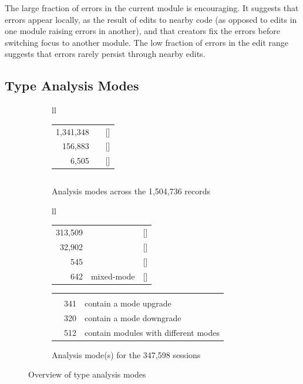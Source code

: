 \documentclass[english,submission,cleveref]{programming}
\begin{document}
The large fraction of errors in the current module is encouraging.
It suggests that errors appear locally, as the result of edits to nearby
code (as opposed to edits in one module raising errors in another), and
that creators fix the errors before switching focus to another
module.
The low fraction of errors in the edit range suggests that errors rarely
persist through nearby edits.


\subsection{Type Analysis Modes}
\label{s:type-analysis-modes}

\begin{figure}[t]\centering
  \begin{subfigure}[t]{\columnwidth}
    \begin{tabular}[t]{ll}
      \begin{tabular}[t]{r@{~~}l@{~}r}
         1,341,348 & \mnocheck{}          & [\pct{89.14}] \\
           156,883 & \mnonstrict{}        & [\pct{10.43}] \\
             6,505 & \mstrict{}           & [\pct{ 0.43}]
      \end{tabular}
      \begin{tabular}[t]{r@{~~}l@{~~}r}
      \end{tabular}
    \end{tabular}
    \caption{Analysis modes across the 1,504,736 records}
    \label{f:total-records}
  \end{subfigure}

  \begin{subfigure}[t]{\columnwidth}
    \begin{tabular}[t]{ll} \\
      \begin{tabular}[t]{r@{~~}r@{~}r}
        313,509 & \mnocheck{}   & [\pct{90.19}] \\
         32,902 & \mnonstrict{} & [\pct{ 9.47}] \\
            545 & \mstrict{}    & [\pct{ 0.16}] \\
            642 & mixed-mode    & [\pct{ 0.18}]
      \end{tabular}
      \begin{tabular}[t]{l@{~~}ll}
        \zerowidth{Among the mixed-mode sessions:} \\
        & 341 & contain a mode upgrade \\
        & 320 & contain a mode downgrade \\
        & 512 & contain modules with different modes
      \end{tabular}
    \end{tabular}
    \caption{Analysis mode(s) for the 347,598 sessions}
    \label{f:total-sessions}
  \end{subfigure}

  \caption{Overview of type analysis modes}
  \label{f:dataset-overview}
\end{figure}
\end{document}
